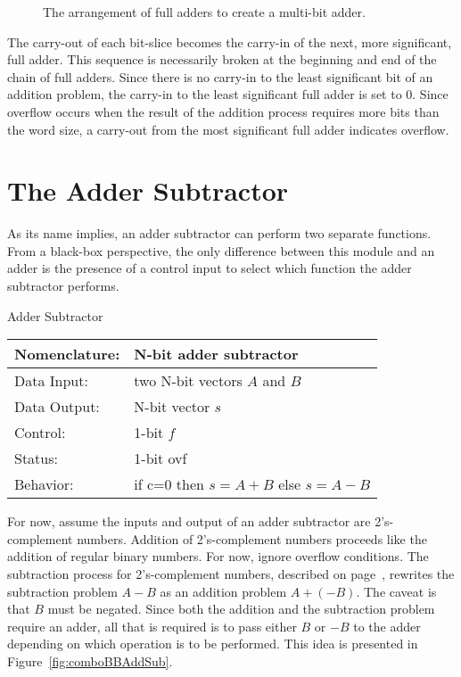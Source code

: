     \begin{figure}[ht]
        \caption{The arrangement of full adders to create a multi-bit
        adder.}
        \label{fig:comboBBadder}
    \end{figure}
    \label{page:add}

    The carry-out of each bit-slice becomes the carry-in of the
    next, more significant, full adder.  This sequence is necessarily
    broken at the beginning and end of the chain of full
    adders.  Since there is no carry-in to the least significant
    bit of an addition problem, the carry-in to the least significant
    full adder is set to 0.  Since overflow occurs when the result
    of the addition process requires more bits than the word size, a
    carry-out from the most significant full adder indicates overflow.

\section{The Adder Subtractor}

As its name implies, an adder subtractor can perform two separate
functions.  From a black-box perspective, the only difference between
this module and an adder is the presence of a control input to select
which function the adder subtractor performs.

\begin{buildingblock}{Adder Subtractor}
    \label{buildingblock:adderSubtractor}
        \begin{tabular}{|l|p{3.5in}|} \hline
            Nomenclature:  & N-bit adder subtractor                 \\ \hline
            Data Input:    & two N-bit vectors $A$ and $B$           \\ \hline
            Data Output:   & N-bit vector  $s$               \\ \hline
            Control:       & 1-bit $f$                     \\ \hline
            Status:        & 1-bit ovf                 \\ \hline
            Behavior:      & if c=0 then $s = A+B$ else $s=A-B$     \\ \hline
        \end{tabular}
    \end{buildingblock}

    For now, assume the inputs and output of an adder subtractor are
    2's-complement numbers.  Addition of 2's-complement numbers proceeds
    like the addition of regular binary numbers.  For now,
    ignore overflow conditions.  The subtraction process
    for 2's-complement numbers, described on page~\pageref{page:2sub}, rewrites
    the subtraction problem $A-B$ as an addition problem $A+(-B)$.  The caveat
    is that $B$ must be negated.  Since both the addition and the subtraction
    problem
    require an adder, all that is required is to pass either $B$ or $-B$ to the
    adder depending on which operation is to be performed.  This idea is
    presented in Figure~\ref{fig:comboBBAddSub}.

